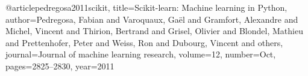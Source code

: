 @article{pedregosa2011scikit, 
 title={Scikit-learn: Machine learning in Python}, 
 author={Pedregosa, Fabian and Varoquaux, Ga{\"e}l and Gramfort, Alexandre and Michel, Vincent and Thirion, Bertrand and Grisel, Olivier and Blondel, Mathieu and Prettenhofer, Peter and Weiss, Ron and Dubourg, Vincent and others}, 
 journal={Journal of machine learning research}, 
 volume={12}, 
 number={Oct}, 
 pages={2825--2830}, 
 year={2011}} 
